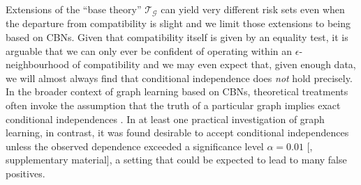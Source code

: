 Extensions of the ``base theory'' $\mathscr{T}_{\mathcal{G}}$ can yield very different risk sets even when the departure from compatibility is slight and we limit those extensions to being based on CBNs. Given that compatibility itself is given by an equality test, it is arguable that we can only ever be confident of operating within an $\epsilon$-neighbourhood of compatibility and we may even expect that, given enough data, we will almost always find that conditional independence does \emph{not} hold precisely\citep{gelman_bayesian_2010,meehl_theory-testing_1967,berkson_difficulties_1938}. In the broader context of graph learning based on CBNs, theoretical treatments often invoke the assumption that the truth of a particular graph implies exact conditional independences \citep{meek_strong_1995}. In at least one practical investigation of graph learning, in contrast, it was found desirable to accept conditional independences unless the observed dependence exceeded a significance level $\alpha=0.01$ [\cite{maathuis_predicting_2010}, supplementary material], a setting that could be expected to lead to many false positives.